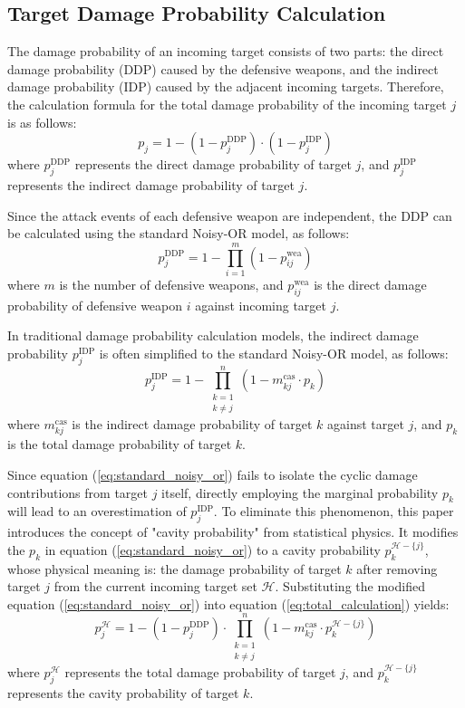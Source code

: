 \documentclass[lettersize,journal]{IEEEtran}
\begin{document}
\subsection{Target Damage Probability Calculation}
The damage probability of an incoming target consists of two parts: the direct damage probability (DDP) caused by the defensive weapons, and the indirect damage probability (IDP) caused by the adjacent incoming targets. Therefore, the calculation formula for the total damage probability of the incoming target $j$ is as follows:
\begin{equation}
    p_j = 1 -  (1 - p_j^{\text{DDP}}) \cdot (1 - p_j^{\text{IDP}})
    \label{eq:total_calculation}
\end{equation}
where $p_j^{\text{DDP}}$ represents the direct damage probability of target $j$, and $p_j^{\text{IDP}}$ represents the indirect damage probability of target $j$.

Since the attack events of each defensive weapon are independent, the DDP can be calculated using the standard Noisy-OR model, as follows:
\begin{equation}
    p_j^{\text{DDP}} = 1 - \prod_{i=1}^{m} (1 - p_{ij}^{\text{wea}})
    \label{eq:DDP_calculation}
\end{equation}
where $m$ is the number of defensive weapons, and $p_{ij}^{\text{wea}}$ is the direct damage probability of defensive weapon $i$ against incoming target $j$.

In traditional damage probability calculation models, the indirect damage probability $p_j^{\text{IDP}}$ is often simplified to the standard Noisy-OR model, as follows:
\begin{equation}
    p_j^{\text{IDP}} = 1 - \prod_{\substack{k = 1 \\ k \ne j}}^{n} (1 - m_{kj}^{\text{cas}} \cdot p_k)
    \label{eq:standard_noisy_or}
\end{equation}
where $m_{kj}^{\text{cas}}$ is the indirect damage probability of target $k$ against target $j$, and $p_k$ is the total damage probability of target $k$.

Since equation (\ref{eq:standard_noisy_or}) fails to isolate the cyclic damage contributions from target $j$ itself, directly employing the marginal probability $p_k$ will lead to an overestimation of $p_j^{\text{IDP}}$. To eliminate this phenomenon, this paper introduces the concept of "cavity probability" from statistical physics. It modifies the $p_k$ in equation (\ref{eq:standard_noisy_or}) to a cavity probability $p_k^{\mathcal{H}-\{j\}}$, whose physical meaning is: the damage probability of target $k$ after removing target $j$ from the current incoming target set $\mathcal{H}$. Substituting the modified equation (\ref{eq:standard_noisy_or}) into equation (\ref{eq:total_calculation}) yields:
\begin{equation}
    p_j^{\mathcal{H}}=1-(1-p_j^{\text{DDP}}) \cdot \prod_{\substack{k = 1 \\ k \ne j}}^{n}(1-m_{kj}^{\text{cas}} \cdot p_k^{\mathcal{H}-\{j\}})
    \label{eq:fixed_noisy_or}
\end{equation}
where $p_j^{\mathcal{H}}$ represents the total damage probability of target $j$, and $p_k^{\mathcal{H}-\{j\}}$ represents the cavity probability of target $k$.
\end{document}
